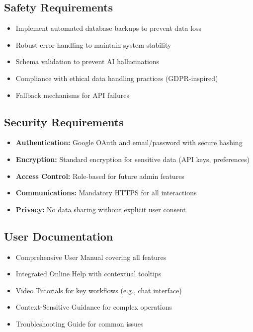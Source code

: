 \documentclass[12pt,a4paper]{article}
\begin{document}
\subsection{Safety Requirements}
\begin{itemize}[leftmargin=*, itemsep=0.3em]
    \item Implement automated database backups to prevent data loss
    \item Robust error handling to maintain system stability
    \item Schema validation to prevent AI hallucinations
    \item Compliance with ethical data handling practices (GDPR-inspired)
    \item Fallback mechanisms for API failures
\end{itemize}
\subsection{Security Requirements}
\begin{infobox}
\begin{itemize}[leftmargin=*, itemsep=0.3em]
    \item \textbf{Authentication:} Google OAuth and email/password with secure hashing
    \item \textbf{Encryption:} Standard encryption for sensitive data (API keys, preferences)
    \item \textbf{Access Control:} Role-based for future admin features
    \item \textbf{Communications:} Mandatory HTTPS for all interactions
    \item \textbf{Privacy:} No data sharing without explicit user consent
\end{itemize}
\end{infobox}
\subsection{User Documentation}
\begin{itemize}[leftmargin=*, itemsep=0.3em]
    \item Comprehensive User Manual covering all features
    \item Integrated Online Help with contextual tooltips
    \item Video Tutorials for key workflows (e.g., chat interface)
    \item Context-Sensitive Guidance for complex operations
    \item Troubleshooting Guide for common issues
\end{itemize}
\end{document}
